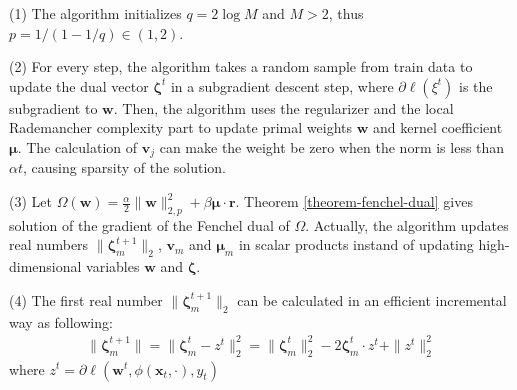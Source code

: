 \documentclass{article}
\begin{document}
(1) The algorithm initializes $q=2\log M$ and $M>2$, thus $p=1/(1-1/q) \in (1,2)$.

(2) For every step, the algorithm takes a random sample from train data to update the dual vector $\mathbf{\zeta}^t$ in a subgradient descent step, where $\partial{\ell(\xi^t)}$ is the subgradient to $\mathbf{w}$. Then, the algorithm uses the regularizer and the local Rademancher complexity part to update primal weights $\mathbf{w}$ and kernel coefficient $\mathbf{\mu}$. The calculation of $\mathbf{v}_j$ can make the weight be zero when the norm is less than $\alpha t$, causing sparsity of the solution.

(3) Let $\Omega(\mathbf{w})=\frac{\alpha}{2}\|\mathbf{w}\|_{2,p}^2 + \beta\mathbf{\mu} \cdot \mathbf{r}$. Theorem \ref{theorem-fenchel-dual} gives solution of the gradient of the Fenchel dual of $\Omega$. Actually, the algorithm updates real numbers $\|\mathbf{\zeta}_m^{t+1}\|_2$, $\mathbf{v}_m$ and $\mathbf{\mu}_m$ in scalar products instand of updating high-dimensional variables $\mathbf{w}$ and $\mathbf{\zeta}$.

(4) The first real number $\|\mathbf{\zeta}_m^{t+1}\|_2$ can be calculated in an efficient incremental way as following:
\begin{align*}
    \|\mathbf{\zeta}_m^{t+1}\|
    =\|\mathbf{\zeta}_m^{t}-z^t\|_2^2
    =\|\mathbf{\zeta}_m^{t}\|_2^2-2\mathbf{\zeta}_m^t \cdot z^t +\|z^t\|_2^2
\end{align*}
where $z^t=\partial\ell(\mathbf{w}^t,\phi(\mathbf{x}_t,\cdot), y_t)$
\end{document}
